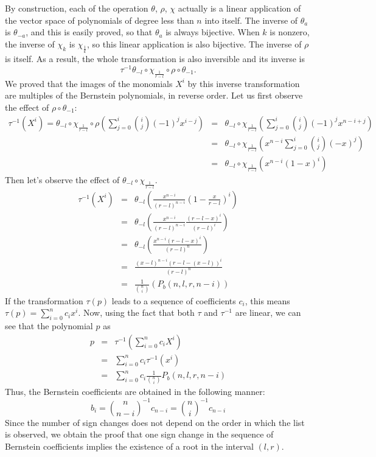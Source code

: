 \documentclass{mscs}
\begin{document}
By construction, each of the operation \(\theta\), \(\rho\), \(\chi\)
actually is a linear application
of the vector space of polynomials of degree less than \(n\) into itself.
The inverse of \(\theta_a\) is \(\theta_{-a}\), and this is easily proved,
so that \(\theta_a\) is always bijective.  When \(k\) is nonzero,
the inverse of \(\chi_k\) is \(\chi_{\frac{1}{k}}\), so this linear
application is also bijective.  The inverse of \(\rho\) is itself.
As a result, the whole transformation is also inversible and its inverse
is \[\tau^{-1}\theta_{-l}\circ\chi_{\frac{1}{r-l}} \circ \rho \circ \theta_{-1}.\]
We proved that the images of the monomials \(X^i\) by this inverse
transformation are multiples of the Bernstein polynomials, in reverse order.
Let us first observe the effect of \(\rho\circ \theta_{-1}\):
\begin{eqnarray*}
\tau^{-1}(X^i)=
\theta_{-l}\circ\chi_{\frac{1}{r-l}} \circ \rho\left(\sum_{j=0}^i\binom{i}{j}(-1)^jx^{i-j}\right)
&=&
\theta_{-l}\circ\chi_{\frac{1}{r-l}}\left( \sum_{j=0}^i\binom{i}{j}(-1)^j x^{n-i+j}
\right)\\
&=&\theta_{-l}\circ\chi_{\frac{1}{r-l}}\left(x^{n-i}\sum_{j=0}^i\binom{i}{j} (-x)^j\right)\\
&=&\theta_{-l}\circ\chi_{\frac{1}{r-l}}\left(x^{n-i}(1-x)^i\right)
\end{eqnarray*}
Then let's observe the effect of \(\theta_{-l}\circ\chi_{\frac{1}{r-l}}\).
\begin{eqnarray*}
\tau^{-1}(X^i)
&=&\theta_{-l}\left(\frac{x^{n-i}}{(r-l)^{n-i}}\left(1-\frac{x}{r-l}\right)^i\right)\\
&=&\theta_{-l}\left(\frac{x^{n-i}}{(r-l)^{n-i}}\frac{(r-l-x)^i}{(r-l)^i}\right)
\\
&=&\theta_{-l}\left(\frac{x^{n-i}(r-l-x)^i}{(r-l)^n}\right)\\
&=&\frac{(x-l)^{n-i}(r-l-(x-l))^i}{(r-l)^n}\\
&=&\frac{1}{\binom{n}{i}}(P_b(n,l,r,n-i))
\end{eqnarray*}
If the transformation \(\tau(p)\) leads to a sequence
of coefficients \(c_i\), this means \(\tau(p)=\sum_{i=0}^{n} c_i x^i\).  Now,
using the fact that both \(\tau\) and \(\tau^{-1}\) are linear, we can see
that the polynomial \(p\) as
\begin{eqnarray*}
p&=&\tau^{-1}\left(\sum_{i=0}^{n} c_i X^i\right)\\
&=&\sum_{i=0}^{n}c_i\tau^{-1}(x^i)\\
&=&\sum_{i=0}^{n}c_i\frac{1}{\binom{n}{i}} P_b(n,l,r,n-i)
\end{eqnarray*}
Thus, the Bernstein coefficients are obtained in the following manner:
\[b_i=\binom{n}{n-i}^{-1}c_{n-i} = \binom{n}{i}^{-1}c_{n-i}\]
Since the number of sign changes does not depend on the order
in which the list is observed, we obtain the proof that one sign
change in the sequence of Bernstein coefficients implies the existence
of a root in the interval \((l,r)\).
\end{document}
